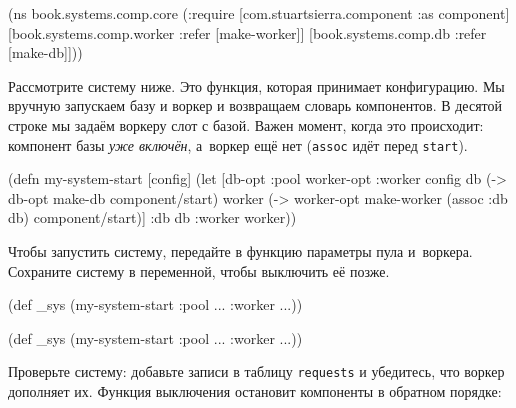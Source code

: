 \else

\begin{english}
  \begin{clojure}
(ns book.systems.comp.core
  (:require
   [com.stuartsierra.component :as component]
   [book.systems.comp.worker :refer [make-worker]]
   [book.systems.comp.db :refer [make-db]]))
  \end{clojure}
\end{english}

\fi

Рассмотрите систему ниже. Это функция, которая принимает конфигурацию. Мы
вручную запускаем базу и воркер и возвращаем словарь компонентов. В десятой
строке мы задаём воркеру слот с базой. Важен момент, когда это происходит:
компонент базы \emph{уже включён}, а~воркер ещё нет (\verb|assoc| идёт перед
\verb|start|).

\begin{english}
  \begin{clojure/lines}
(defn my-system-start
  [config]
  (let [{db-opt :pool
         worker-opt :worker} config
        db (-> db-opt
               make-db
               component/start)
        worker (-> worker-opt
                   make-worker
                   (assoc :db db)
                   component/start)]
    {:db db :worker worker}))
  \end{clojure/lines}
\end{english}

Чтобы запустить систему, передайте в функцию параметры пула и~воркера. Сохраните
систему в переменной, чтобы выключить её позже.

\ifx\DEVICETYPE\MOBILE

\begin{english}
  \begin{clojure}
(def _sys
  (my-system-start
    {:pool {...} :worker {...}}))
  \end{clojure}
\end{english}

\else

\begin{english}
  \begin{clojure}
(def _sys (my-system-start {:pool {...} :worker {...}}))
  \end{clojure}
\end{english}

\fi

Проверьте систему: добавьте записи в таблицу \verb|requests| и убедитесь, что
воркер дополняет их. Функция выключения остановит компоненты в обратном порядке:

